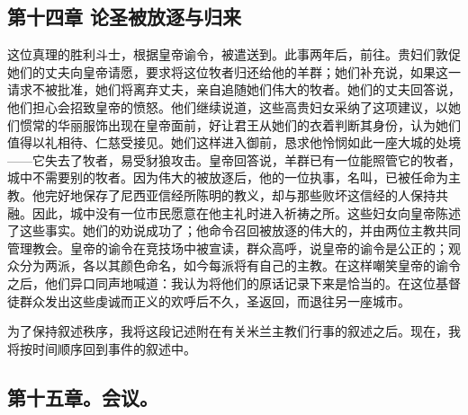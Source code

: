 
\subsection{第十四章 论圣被放逐与归来}

这位真理的胜利斗士，根据皇帝谕令，被遣送到。此事两年后，前往。贵妇们敦促她们的丈夫向皇帝请愿，要求将这位牧者归还给他的羊群；她们补充说，如果这一请求不被批准，她们将离弃丈夫，亲自追随她们伟大的牧者。她们的丈夫回答说，他们担心会招致皇帝的愤怒。他们继续说道，这些高贵妇女采纳了这项建议，以她们惯常的华丽服饰出现在皇帝面前，好让君王从她们的衣着判断其身份，认为她们值得以礼相待、仁慈受接见。她们这样进入御前，恳求他怜悯如此一座大城的处境——它失去了牧者，易受豺狼攻击。皇帝回答说，羊群已有一位能照管它的牧者，城中不需要别的牧者。因为伟大的被放逐后，他的一位执事，名叫，已被任命为主教。他完好地保存了尼西亚信经所陈明的教义，却与那些败坏这信经的人保持共融。因此，城中没有一位市民愿意在他主礼时进入祈祷之所。这些妇女向皇帝陈述了这些事实。她们的劝说成功了；他命令召回被放逐的伟大的，并由两位主教共同管理教会。皇帝的谕令在竞技场中被宣读，群众高呼，说皇帝的谕令是公正的；观众分为两派，各以其颜色命名，如今每派将有自己的主教。在这样嘲笑皇帝的谕令之后，他们异口同声地喊道：我认为将他们的原话记录下来是恰当的。在这位基督徒群众发出这些虔诚而正义的欢呼后不久，圣返回，而退往另一座城市。\par

为了保持叙述秩序，我将这段记述附在有关米兰主教们行事的叙述之后。现在，我将按时间顺序回到事件的叙述中。\par


\subsection{第十五章。会议。}

